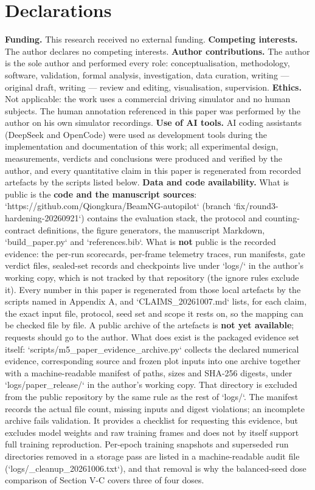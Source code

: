 \documentclass[journal]{IEEEtran}
\begin{document}
\section*{Declarations}
\textbf{Funding.} This research received no external funding.
\textbf{Competing interests.} The author declares no competing interests.
\textbf{Author contributions.} The author is the sole author and performed every role:
conceptualisation, methodology, software, validation, formal analysis, investigation, data
curation, writing --- original draft, writing --- review and editing, visualisation, supervision.
\textbf{Ethics.} Not applicable: the work uses a commercial driving simulator and no human subjects.
The human annotation referenced in this paper was performed by the author on his own simulator
recordings.
\textbf{Use of AI tools.} AI coding assistants (DeepSeek and OpenCode) were used as development tools
during the implementation and documentation of this work; all experimental design, measurements,
verdicts and conclusions were produced and verified by the author, and every quantitative claim in
this paper is regenerated from recorded artefacts by the scripts listed below.
\textbf{Data and code availability.} What is public is the \textbf{code and the manuscript sources}:
`https://github.com/Qiongkura/BeamNG-autopilot` (branch `fix/round3-hardening-20260921`) contains
the evaluation stack, the protocol and counting-contract definitions, the figure generators, the
manuscript Markdown, `build_paper.py` and `references.bib`. What is \textbf{not} public is the recorded
evidence: the per-run scorecards, per-frame telemetry traces, run manifests, gate verdict files,
sealed-set records and checkpoints live under `logs/` in the author's working copy, which is not
tracked by that repository (the ignore rules exclude it). Every number in this paper is regenerated
from those local artefacts by the scripts named in Appendix A, and `CLAIMS_20261007.md` lists, for
each claim, the exact input file, protocol, seed set and scope it rests on, so the mapping can be
checked file by file. A public archive of the artefacts is \textbf{not yet available}; requests should go to the author. What
does exist is the packaged evidence set itself: `scripts/m5_paper_evidence_archive.py` collects the
declared numerical evidence, corresponding source and frozen plot inputs into one archive together
with a machine-readable manifest of paths, sizes and SHA-256 digests, under `logs/paper_release/` in
the author's working copy. That directory is excluded from the public repository by the same rule as
the rest of `logs/`. The manifest records the actual file count, missing inputs and digest violations;
an incomplete archive fails validation. It provides a checklist for requesting this evidence, but
excludes model weights and raw training frames and does not by itself support full training
reproduction. Per-epoch training snapshots and superseded run directories removed in a storage pass
are listed in a machine-readable audit file (`logs/_cleanup_20261006.txt`), and that removal is why
the balanced-seed dose comparison of Section V-C covers three of four doses.
\end{document}
